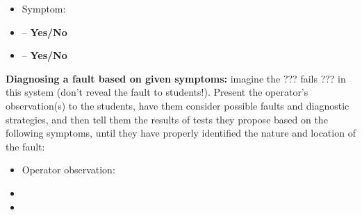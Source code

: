 \begin{itemize}
\item{} Symptom: {\it }
\item{}  -- {\bf Yes/No}
\item{}  -- {\bf Yes/No}
\end{itemize}


\vskip 10pt


\noindent
{\bf Diagnosing a fault based on given symptoms:} imagine the ??? fails ??? in this system (don't reveal the fault to students!).  Present the operator's observation(s) to the students, have them consider possible faults and diagnostic strategies, and then tell them the results of tests they propose based on the following symptoms, until they have properly identified the nature and location of the fault:

\begin{itemize}
\item{} Operator observation: {\it }
\item{} 
\item{} 
\end{itemize}




